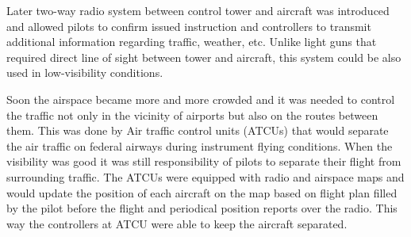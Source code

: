 Later two-way radio system between control tower and aircraft was introduced and allowed pilots to confirm issued instruction and controllers to transmit additional information regarding traffic, weather, etc. Unlike light guns that required direct line of sight between tower and aircraft, this system could be also used in low-visibility conditions.

Soon the airspace became more and more crowded and it was needed to control the traffic not only in the vicinity of airports but also on the routes between them. This was done by Air traffic control units (ATCUs) that would separate the air traffic on federal airways during instrument flying conditions. When the visibility was good it was still responsibility of pilots to separate their flight from surrounding traffic. The ATCUs were equipped with radio and airspace maps and would update the position of each aircraft on the map based on flight plan filled by the pilot before the flight and periodical position reports over the radio. This way the controllers at ATCU were able to keep the aircraft separated.


